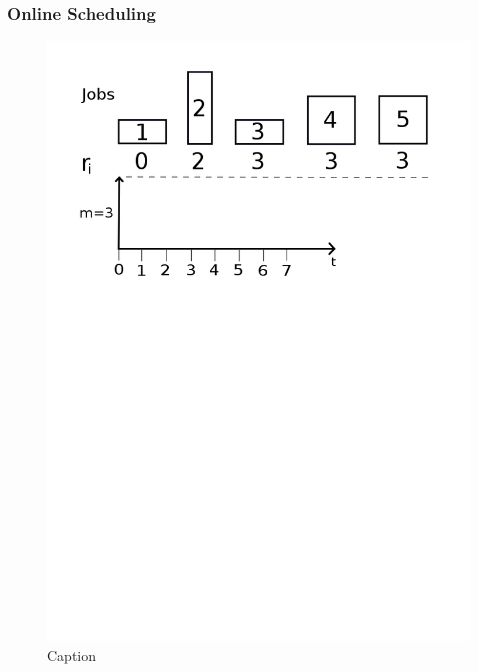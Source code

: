 \documentclass{beamer}
\begin{document}
\begin{frame}
  \frametitle{Online Scheduling}
  \begin{figure}[H]
          \centering
          \includegraphics[width=\textwidth]{online.png}
          \caption{Caption}
          \label{fig:online_png}
  \end{figure}

\end{frame}
\end{document}
